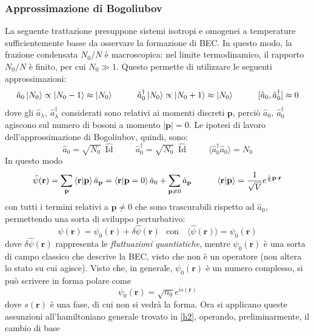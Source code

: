 \documentclass[11pt, a4paper]{scrartcl}
\theoremstyle{style}
\theoremstyle{style1}
\numberwithin{equation}{subsection}
\begin{document}
\subsubsection{Approssimazione di Bogoliubov}
La seguente trattazione presuppone sistemi isotropi e omogenei a temperature sufficientemente basse da osservare la formazione di BEC.
In questo modo, la frazione condensata $N_0 / N$ \`e macroscopica: nel limite termodinamico, il rapporto $N_0 / N$ \`e finito, per cui $N_0\gg 1$.
Questo permette di utilizzare le seguenti approssimazioni:
\[
	\hat{a}_0 \ket{N_0} \propto \ket{N_0 -1} \approx \ket{N_0} \hspace{1cm}\hat{a}_0^\dagger \ket{N_0} \propto \ket{N_0 + 1} \approx \ket{N_0} \hspace{1cm}[\hat{a}_0 , \hat{a}_0 ^\dagger ] \approx 0
\] 
dove gli $\hat{a}_\lambda , \ \hat{a}^\dagger _\lambda $ considerati sono relativi ai momenti discreti $\mathbf{p} $, perci\`o $\hat{a}_0, \ \hat{a}_0^\dagger $ agiscono sul numero di bosoni a momento $\lvert \mathbf{p}  \rvert =0$.
Le ipotesi di lavoro dell'approssimazione di Bogoliubov, quindi, sono:
\[
\hat{a}_0 = \sqrt{N_0}\ \hat{\operatorname{Id} } \hspace{1cm}\hat{a}^\dagger _0 = \sqrt{N_0}\ \hat{\operatorname{Id} } \hspace{1cm} \langle \hat{a}^\dagger _0 \hat{a}_0 \rangle = N_0
\] 
In questo modo
\[
\hat{\psi }(\mathbf{r} ) = \sum_{\mathbf{p} }^{} \braket{\mathbf{r} |\mathbf{p} } \hat{a}_\mathbf{p}  = \braket{\mathbf{r} |\mathbf{p} = 0} \hat{a}_0 + \sum_{\mathbf{p} \neq 0 }^{}\hat{a}_\mathbf{p} \hspace{1cm} \braket{\mathbf{r} |\mathbf{p} } =\frac{1}{\sqrt{V} }e^{\frac{i}{\hbar }\mathbf{p} \cdot \mathbf{r} }
\] 
con tutti i termini relativi a $\mathbf{p} \neq 0$ che sono trascurabili rispetto ad $\hat{a}_0 $, permettendo una sorta di sviluppo perturbativo: 
\[
\hat{\psi }(\mathbf{r} ) = \psi_0 (\mathbf{r} )+ \delta \hat{\psi }(\mathbf{r} ) \ \, \text{ con }\ \ \ \langle \hat{\psi }(\mathbf{r} ) \rangle = \psi _0(\mathbf{r} )
\] 
dove $\delta \hat{\psi }(\mathbf{r} )$ rappresenta le \textit{fluttuazioni quantistiche}, mentre $\psi _0(\mathbf{r} )$ \`e una sorta di campo classico che descrive la BEC, visto che non \`e un operatore (non altera lo stato su cui agisce). 
Visto che, in generale, $\psi _0(\mathbf{r} )$ \`e un numero complesso, si pu\`o scrivere in forma polare come
\[
\psi _0 (\mathbf{r} ) = \sqrt{n_0}  e^{is (\mathbf{r} )}
\] 
dove $s(\mathbf{r} )$ \`e una fase, di cui non si vedr\`a la forma.
Ora si applicano queste assunzioni all'hamiltoniano generale trovato in \ref{h2}, operando, preliminarmente, il cambio di base
\end{document}
